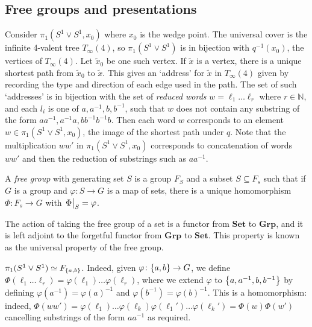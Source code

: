 \subsection{Free groups and presentations}
Consider \( \pi_1(S^1 \vee S^1, x_0) \) where \( x_0 \) is the wedge point.
The universal cover is the infinite 4-valent tree \( T_\infty(4) \), so \( \pi_1(S^1 \vee S^1) \) is in bijection with \( q^{-1}(x_0) \), the vertices of \( T_\infty(4) \).
Let \( \widetilde x_0 \) be one such vertex.
If \( \widetilde x \) is a vertex, there is a unique shortest path from \( \widetilde x_0 \) to \( \widetilde x \).
This gives an `address' for \( \widetilde x \) in \( T_\infty(4) \) given by recording the type and direction of each edge used in the path.
The set of such `addresses' is in bijection with the set of \emph{reduced words} \( w = \ell_1 \dots \ell_r \) where \( r \in \mathbb N \), and each \( l_i \) is one of \( a, a^{-1}, b, b^{-1} \), such that \( w \) does not contain any substring of the form \( aa^{-1}, a^{-1}a, bb^{-1} b^{-1}b \).
Then each word \( w \) corresponds to an element \( w \in \pi_1(S^1 \vee S^1, x_0) \), the image of the shortest path under \( q \).
Note that the multiplication \( ww' \) in \( \pi_1(S^1 \vee S^1, x_0) \) corresponds to concatenation of words \( ww' \) and then the reduction of substrings such as \( aa^{-1} \).
\begin{definition}
    A \emph{free group} with generating set \( S \) is a group \( F_S \) and a subset \( S \subseteq F_s \) such that if \( G \) is a group and \( \varphi \colon S \to G \) is a map of sets, there is a unique homomorphism \( \Phi \colon F_s \to G \) with \( \eval{\Phi}_S = \varphi \).
    \begin{center}
    \end{center}
\end{definition}
\begin{remark}
    The action of taking the free group of a set is a functor from \( \mathbf{Set} \) to \( \mathbf{Grp} \), and it is left adjoint to the forgetful functor from \( \mathbf{Grp} \) to \( \mathbf{Set} \).
    This property is known as the universal property of the free group.
\end{remark}
\begin{example}
    \( \pi_1(S^1 \vee S^1) \simeq F_{\qty{a,b}} \).
    Indeed, given \( \varphi \colon \qty{a,b} \to G \), we define \( \Phi(\ell_1 \dots \ell_r) = \varphi(\ell_1) \dots \varphi(\ell_r) \), where we extend \( \varphi \) to \( \qty{a, a^{-1}, b, b^{-1}} \) by defining \( \varphi(a^{-1}) = \varphi(a)^{-1} \) and \( \varphi(b^{-1}) = \varphi(b)^{-1} \).
    This is a homomorphism: indeed, \( \Phi(ww') = \varphi(\ell_1) \dots \varphi(\ell_k) \varphi(\ell_1') \dots \varphi(\ell_k') = \Phi(w)\Phi(w') \) cancelling substrings of the form \( aa^{-1} \) as required.
\end{example}
